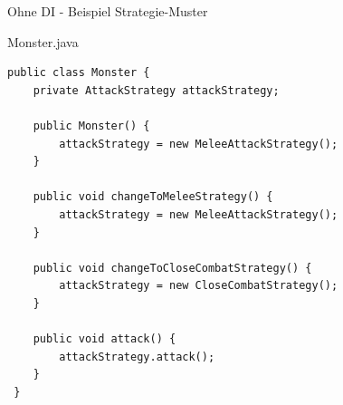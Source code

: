 \begin{frame}[fragile]{Ohne DI - Beispiel Strategie-Muster}
	\begin{exampleblock}{Monster.java}
		\begin{lstlisting}
public class Monster {
	private AttackStrategy attackStrategy;
	
	public Monster() {
		attackStrategy = new MeleeAttackStrategy();
	}
	
	public void changeToMeleeStrategy() {
		attackStrategy = new MeleeAttackStrategy();
	}
	
	public void changeToCloseCombatStrategy() {
		attackStrategy = new CloseCombatStrategy();
	}

	public void attack() {
		attackStrategy.attack();
	}
 }
		\end{lstlisting}	
	\end{exampleblock}
\end{frame}

